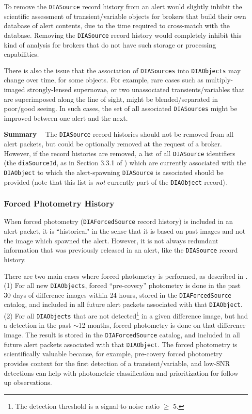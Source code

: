 \documentclass[DM,lsstdraft,authoryear,toc]{lsstdoc}
\begin{document}
To remove the {\tt DIASource} record history from an alert would slightly inhibit the scientific assessment of transient/variable objects for brokers that build their own database of alert contents, due to the time required to cross-match with the database.
Removing the {\tt DIASource} record history would completely inhibit this kind of analysis for brokers that do not have such storage or processing capabilities.

There is also the issue that the association of {\tt DIASources} into {\tt DIAObjects} may change over time, for some objects.
For example, rare cases such as multiply-imaged strongly-lensed supernovae, or two unassociated transients/variables that are superimposed along the line of sight, might be blended/separated in poor/good seeing.
In such cases, the set of all associated {\tt DIASources} might be improved between one alert and the next. 

{\bf Summary --} The {\tt DIASource} record histories should not be removed from all alert packets, but could be optionally removed at the request of a broker.
However, if the record histories are removed, a list of all {\tt DIASource} identifiers (the {\tt diaSourceId}, as in Section 3.3.1 of ) which are currently associated with the {\tt DIAObject} to which the alert-spawning {\tt DIASource} is associated should be provided (note that this list is \emph{not} currently part of the {\tt DIAObject} record).

\subsubsection{Forced Photometry History}\label{sssec:packets_remove_fp}

When forced photometry ({\tt DIAForcedSource} record history) is included in an alert packet, it is ``historical" in the sense that it is based on past images and not the image which spawned the alert.
However, it is not always redundant information that was previously released in an alert, like the {\tt DIASource} record history.

There are two main cases where forced photometry is performed, as described in .
(1) For all new {\tt DIAObjects}, forced ``pre-covery'' photometry is done in the past 30 days of difference images within 24 hours, stored in the {\tt DIAForcedSource} catalog, and included in all future alert packets associated with that {\tt DIAObject}.
(2) For all {\tt DIAObjects} that are not detected\footnote{The detection threshold is a signal-to-noise ratio $\geq$ 5.} in a given difference image, but had a detection in the past $\sim$12 months, forced photometry is done on that difference image.
The result is stored in the {\tt DIAForcedSource} catalog, and included in all future alert packets associated with that {\tt DIAObject}.
The forced photometry is scientifically valuable because, for example, pre-covery forced photometry provides context for the first detection of a transient/variable, and low-SNR detections can help with photometric classification and prioritization for follow-up observations. 
\end{document}
